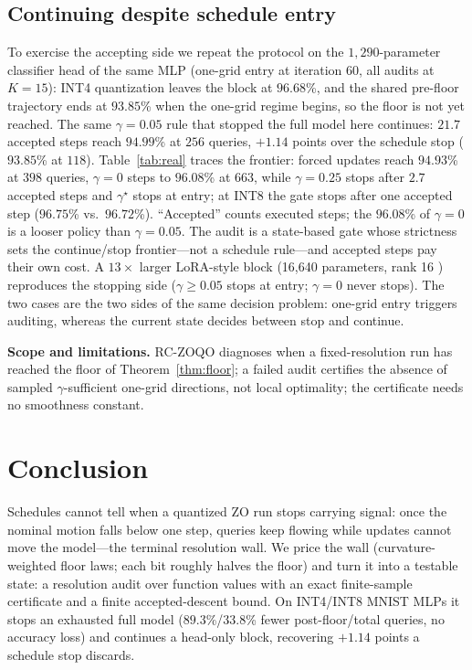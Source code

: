 \documentclass{article}
\begin{document}
\subsection{Continuing despite schedule entry}
\label{sec:gate}
To exercise the accepting side we repeat the protocol on the $1{,}290$-parameter classifier head of the same MLP (one-grid entry at iteration $60$, all audits at $K=15$): INT4 quantization leaves the block at $96.68$\%, and the shared pre-floor trajectory ends at $93.85$\% when the one-grid regime begins, so the floor is not yet reached. The same $\gamma=0.05$ rule that stopped the full model here continues: $21.7$ accepted steps reach $94.99$\% at $256$ queries, $+1.14$ points over the schedule stop ($93.85$\% at $118$). Table~\ref{tab:real} traces the frontier: forced updates reach $94.93$\% at $398$ queries, $\gamma=0$ steps to $96.08$\% at $663$, while $\gamma=0.25$ stops after $2.7$ accepted steps and $\gamma^\star$ stops at entry; at INT8 the gate stops after one accepted step ($96.75$\% vs.~$96.72$\%). ``Accepted'' counts executed steps; the $96.08$\% of $\gamma=0$ is a looser policy than $\gamma=0.05$. The audit is a state-based gate whose strictness sets the continue/stop frontier---not a schedule rule---and accepted steps pay their own cost. A $13\times$ larger LoRA-style block (16,640 parameters, rank 16 \cite{hu2022lora}) reproduces the stopping side ($\gamma\ge0.05$ stops at entry; $\gamma=0$ never stops). The two cases are the two sides of the same decision problem: one-grid entry triggers auditing, whereas the current state decides between stop and continue.

\noindent\textbf{Scope and limitations.} RC-ZOQO diagnoses when a fixed-resolution run has reached the floor of Theorem~\ref{thm:floor}; a failed audit certifies the absence of sampled $\gamma$-sufficient one-grid directions, not local optimality; the certificate needs no smoothness constant.

\enlargethispage{4\baselineskip}
\section{Conclusion}
Schedules cannot tell when a quantized ZO run stops carrying signal:
once the nominal motion falls below one step, queries keep flowing
while updates cannot move the model---the terminal resolution wall.
We price the wall (curvature-weighted floor laws; each bit roughly
halves the floor) and turn it into a testable state: a resolution
audit over function values with an exact finite-sample certificate
and a finite accepted-descent bound. On INT4/INT8 MNIST MLPs it stops
an exhausted full model ($89.3$\%/$33.8$\% fewer post-floor/total
queries, no accuracy loss) and continues a head-only block, recovering
$+1.14$ points a schedule stop discards.
\end{document}

